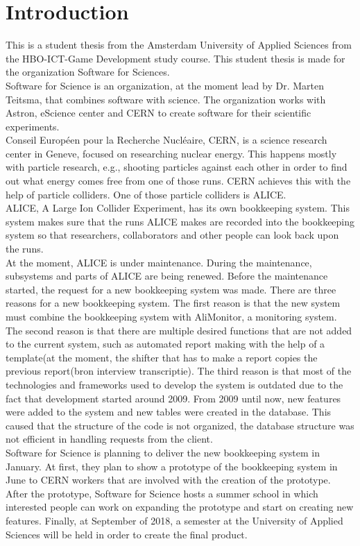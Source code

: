\documentclass[paper=a4, fontsize=11pt,twoside]{scrartcl}	%
\begin{document}
\section{Introduction}
This is a student thesis from the Amsterdam University of Applied Sciences from the HBO-ICT-Game Development study course. This student thesis is made for the organization Software for Sciences. \\
Software for Science is an organization, at the moment lead by Dr. Marten Teitsma, that combines software with science. The organization works with Astron, eScience center and CERN to create software for their scientific experiments. \\
Conseil Européen pour la Recherche Nucléaire, CERN, is a science research center in Geneve, focused on researching nuclear energy. This happens mostly with particle research, e.g., shooting particles against each other in order to find out what energy comes free from one of those runs. CERN achieves this with the help of particle colliders. One of those particle colliders is ALICE. \\
ALICE, A Large Ion Collider Experiment, has its own bookkeeping system. This system makes sure that the runs ALICE makes are recorded into the bookkeeping system so that researchers, collaborators and other people can look back upon the runs.  \\
At the moment, ALICE is under maintenance. During the maintenance, subsystems and parts of ALICE are being renewed. Before the maintenance started, the request for a new bookkeeping system was made. There are three reasons for a new bookkeeping system. The first reason is that the new system must combine the bookkeeping system with AliMonitor, a monitoring system. The second reason is that there are multiple desired functions that are not added to the current system, such as automated report making with the help of a template(at the moment, the shifter that has to make a report copies the previous report(bron interview transcriptie). The third reason is that most of the technologies and frameworks used to develop the system is outdated due to the fact that development started around 2009. From 2009 until now, new features were added to the system and new tables were created in the database. This caused that the structure of the code is not organized, the database structure was not efficient in handling requests from the client. \\
Software for Science is planning to deliver the new bookkeeping system in January. At first, they plan to show a prototype of the bookkeeping system in June to CERN workers that are involved with the creation of the prototype. After the prototype, Software for Science hosts a summer school in which interested people can work on expanding the prototype and start on creating new features. Finally, at September of 2018, a semester at the University of Applied Sciences will be held in order to create the final product. \\
\end{document}
